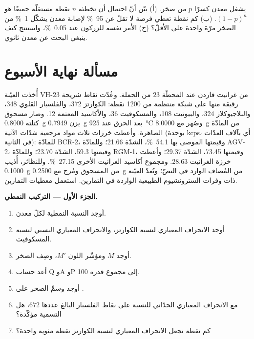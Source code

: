 \begin{exercise}[$\star\star\star$]\label{exo:b2:field-lab-methods-2:12}
يشغل معدن كسرًا $p$ من صخر. (أ) بيّن أنّ احتمال أن تخطئه $n$ نقطة مستقلّة
جميعًا هو $(1-p)^n$. (ب) كم نقطة تعطي فرصة لا تقلّ عن \qty{95}{\percent} لإصابة
معدن يشكّل \qty{1}{\percent} من الصخر مرّة واحدة على الأقلّ؟ (ج) الأمر نفسه للزركون عند
\qty{0.05}{\percent}، واستنتج كيف ينبغي البحث عن معدن ثانوي.
\end{exercise}

\section*{مسألة نهاية الأسبوع}

\begin{problem}\label{pb:b2:field-lab-methods-2:1}
أُخذت العيّنة VH-23 من غرانيت فاردن عند المحطّة 23 من الحملة. وعُدّت نقاط شريحة رقيقة
منها على شبكة منتظمة من 1200 نقطة: الكوارتز 372، والفلسبار القلوي 348، والبلاجيوكلاز 324،
والبيوتيت 108، والمسكوفيت 36، والأكاسيد المعتمة 12. وصار مسحوق كتلته \qty{0.8000}{g} يزن \qty{0.7949}{g}
بعد الحرق عند \qty{925}{\celsius} وصُهر مع \qty{8.0000}{g} من المادّة الصاهرة. وأعطت خرزات ثلاث
مواد مرجعية شدّات  الآتية (بوحدة \unit{kcps}، أي بآلاف العدّات في الثانية): للمادّة BCR-2، وقيمتها
الموصى بها \qty{54.1}{\percent}، الشدّة 21.66؛ وللمادّة AGV-2، وقيمتها 59.3، الشدّة 23.70؛ وللمادّة RGM-1، وقيمتها 73.45، الشدّة 29.37؛ وأعطت خرزة الغرانيت
28.63. ومجموع أكاسيد الغرانيت الأخرى \qty{27.15}{\percent}. وللنظائر،
أُذيب \qty{0.1000}{g} من المسحوق ومُزج مع \qty{0.2500}{g} من المُضاف الوارد في النصّ؛
وتُعدّ العيّنة ذات وفرات السترونشيوم الطبيعية الواردة في التمارين. استعمل معطيات
التمارين.

\noindent\textbf{الجزء الأول --- التركيب النمطي.}
\begin{enumerate}
  \item أوجد النسبة النمطية لكلّ معدن.
  \item أوجد الانحراف المعياري لنسبة الكوارتز، والانحراف المعياري النسبي
        لنسبة المسكوفيت.
  \item أوجد $M$ ومؤشّر اللون $M'$، وصِف الصخر.
  \item أعد حساب Q وA وP إلى مجموع قدره 100.
  \item أوجد  وسمِّ الصخر على .
  \item مع الانحراف المعياري الحدّاني للنسبة  على نقاط الفلسبار البالغ عددها 672، هل التسمية
        مؤكّدة؟
  \item كم نقطة تجعل الانحراف المعياري لنسبة الكوارتز نقطة مئوية
        واحدة؟
\end{enumerate}


\end{problem}
